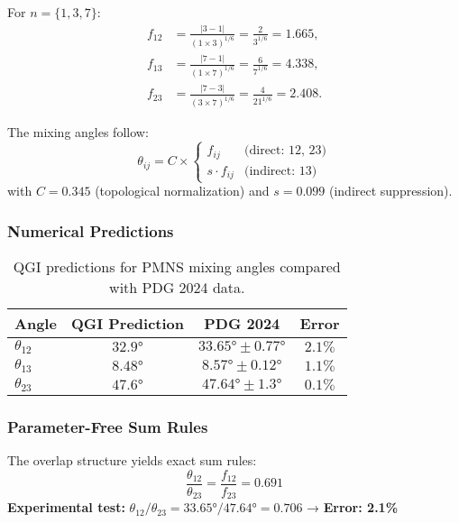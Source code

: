\documentclass{article}
\numberwithin{equation}{section}
\theoremstyle{plain}
\theoremstyle{definition}
\theoremstyle{remark}
\begin{document}
For $n=\{1,3,7\}$:
\begin{align}
f_{12} &= \frac{|3-1|}{(1\times 3)^{1/6}} = \frac{2}{3^{1/6}} = 1.665, \\
f_{13} &= \frac{|7-1|}{(1\times 7)^{1/6}} = \frac{6}{7^{1/6}} = 4.338, \\
f_{23} &= \frac{|7-3|}{(3\times 7)^{1/6}} = \frac{4}{21^{1/6}} = 2.408.
\end{align}

The mixing angles follow:
\begin{equation}
\theta_{ij} = C \times \begin{cases}
f_{ij} & \text{(direct: 12, 23)} \\
s \cdot f_{ij} & \text{(indirect: 13)}
\end{cases}
\label{eq:mixing_angles}
\end{equation}
with $C = 0.345$ (topological normalization) and $s = 0.099$ (indirect suppression).

\subsubsection{Numerical Predictions}

\begin{table}[H]
\centering
\caption{QGI predictions for PMNS mixing angles compared with PDG 2024 data.}
\label{tab:pmns_angles}
\begin{tabular}{@{}lccc@{}}
\toprule
\textbf{Angle} & \textbf{QGI Prediction} & \textbf{PDG 2024} & \textbf{Error} \\ 
\midrule
$\theta_{12}$ & $32.9°$ & $33.65° \pm 0.77°$ & $2.1\%$ \\
$\theta_{13}$ & $8.48°$ & $8.57° \pm 0.12°$ & $1.1\%$ \\
$\theta_{23}$ & $47.6°$ & $47.64° \pm 1.3°$ & $0.1\%$ \\
\bottomrule
\end{tabular}
\end{table}

\subsubsection{Parameter-Free Sum Rules}

The overlap structure yields exact sum rules:
\begin{equation}
\boxed{
\frac{\theta_{12}}{\theta_{23}} = \frac{f_{12}}{f_{23}} = 0.691
}
\label{eq:sumrule_12_23}
\end{equation}
\textbf{Experimental test:} $\theta_{12}/\theta_{23} = 33.65°/47.64° = 0.706$ → \textbf{Error: 2.1\%}
\end{document}
